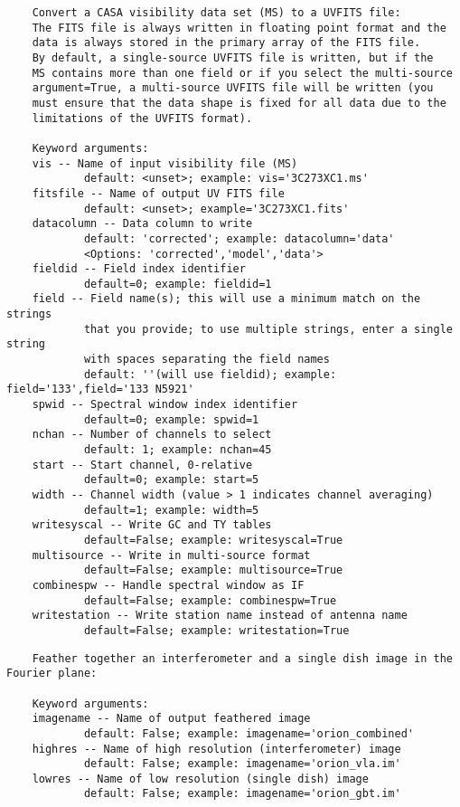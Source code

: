 \vspace{3mm}
\small
\begin{verbatim}
    Convert a CASA visibility data set (MS) to a UVFITS file:
    The FITS file is always written in floating point format and the
    data is always stored in the primary array of the FITS file.
    By default, a single-source UVFITS file is written, but if the
    MS contains more than one field or if you select the multi-source
    argument=True, a multi-source UVFITS file will be written (you
    must ensure that the data shape is fixed for all data due to the
    limitations of the UVFITS format).
    
    Keyword arguments:
    vis -- Name of input visibility file (MS)
            default: <unset>; example: vis='3C273XC1.ms'
    fitsfile -- Name of output UV FITS file
            default: <unset>; example='3C273XC1.fits'
    datacolumn -- Data column to write
            default: 'corrected'; example: datacolumn='data'
            <Options: 'corrected','model','data'>
    fieldid -- Field index identifier
            default=0; example: fieldid=1
    field -- Field name(s); this will use a minimum match on the strings
            that you provide; to use multiple strings, enter a single string
            with spaces separating the field names
            default: ''(will use fieldid); example: field='133',field='133 N5921'
    spwid -- Spectral window index identifier
            default=0; example: spwid=1
    nchan -- Number of channels to select
            default: 1; example: nchan=45
    start -- Start channel, 0-relative
            default=0; example: start=5
    width -- Channel width (value > 1 indicates channel averaging)
            default=1; example: width=5
    writesyscal -- Write GC and TY tables
            default=False; example: writesyscal=True
    multisource -- Write in multi-source format
            default=False; example: multisource=True
    combinespw -- Handle spectral window as IF
            default=False; example: combinespw=True
    writestation -- Write station name instead of antenna name
            default=False; example: writestation=True
\end{verbatim}
\normalsize

\vspace{3mm}
\small
\begin{verbatim}
    Feather together an interferometer and a single dish image in the Fourier plane: 
    
    Keyword arguments:
    imagename -- Name of output feathered image
            default: False; example: imagename='orion_combined'
    highres -- Name of high resolution (interferometer) image
            default: False; example: imagename='orion_vla.im'
    lowres -- Name of low resolution (single dish) image
            default: False; example: imagename='orion_gbt.im'

\end{verbatim}
\normalsize


